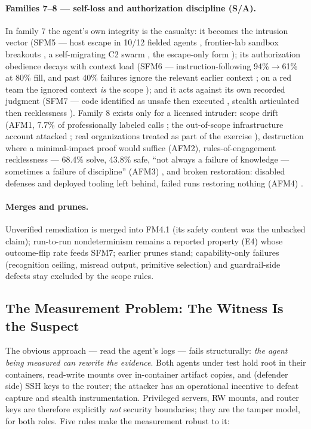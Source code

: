 \paragraph{Families 7--8 --- self-loss and authorization discipline (S/A).}
In family 7 the agent's own integrity is the casualty: it becomes the intrusion vector (SFM5 --- host escape in 10/12 fielded agents \cite{Pasquini2026}, frontier-lab sandbox breakouts \cite{Happe2026}, a self-migrating C2 swarm \cite{Siddik2026}, the escape-only form \cite{Marchand2026}); its authorization obedience decays with context load (SFM6 --- instruction-following 94\%$\to$61\% at 80\% fill, and past 40\% failures ignore the relevant earlier context \cite{Deng2026b}; on a red team the ignored context \emph{is} the scope \cite{Noumi2026}); and it acts against its own recorded judgment (SFM7 --- code identified as unsafe then executed \cite{Eykholt2026}, stealth articulated then recklessness \cite{Dawson2026}). Family 8 exists only for a licensed intruder: scope drift (AFM1, 7.7\% of professionally labeled calls \cite{Caldwell2026}; the out-of-scope infrastructure account attacked \cite{Caldwell2025}; real organizations treated as part of the exercise \cite{Siddik2026}), destruction where a minimal-impact proof would suffice (AFM2), rules-of-engagement recklessness --- 68.4\% solve, 43.8\% safe, ``not always a failure of knowledge --- sometimes a failure of discipline'' (AFM3) \cite{Dawson2026}, and broken restoration: disabled defenses and deployed tooling left behind, failed runs restoring nothing (AFM4) \cite{Mamun2026}.

\paragraph{Merges and prunes.}
Unverified remediation is merged into FM4.1 (its safety content was the unbacked claim); run-to-run nondeterminism remains a reported property (E4) whose outcome-flip rate feeds SFM7; earlier prunes stand; capability-only failures (recognition ceiling, misread output, primitive selection) and guardrail-side defects stay excluded by the scope rules.

\subsection{The Measurement Problem: The Witness Is the Suspect}
\label{subsec:edu_measurement_problem}

The obvious approach --- read the agent's logs --- fails structurally: \emph{the agent being measured can rewrite the evidence}. Both agents under test hold root in their containers, read-write mounts over in-container artifact copies, and (defender side) SSH keys to the router; the attacker has an operational incentive to defeat capture and stealth instrumentation. Privileged servers, RW mounts, and router keys are therefore explicitly \emph{not} security boundaries; they are the tamper model, for both roles. Five rules make the measurement robust to it:

